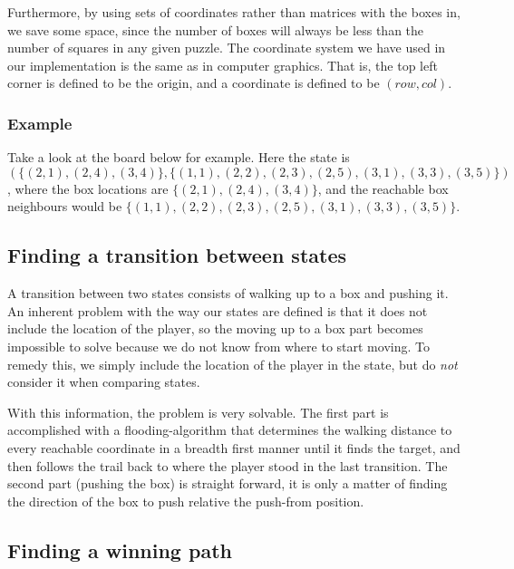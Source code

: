 \documentclass[a4paper,11pt]{article}
\begin{document}
Furthermore, by using sets of coordinates rather than matrices with the boxes in,
we save some space, since the number of boxes will always be less than the number of squares in any
given puzzle.
The coordinate system we have used in our implementation is the same as in computer graphics.
That is, the top left corner is defined to be the origin, and a coordinate is defined to be
$(row, col)$.

\subsubsection{Example}
Take a look at the board below for example.
Here the state is
$( \{(2, 1), (2, 4), (3, 4)\}, \{(1,1), (2,2), (2,3), (2,5), (3,1), (3,3), (3,5)\})$,
where the box locations are
$\{(2, 1), (2, 4), (3, 4)\}$,
and the reachable box neighbours would be
$\{(1,1), (2,2), (2,3), (2,5), (3,1), (3,3), (3,5)\} $.


\subsection{Finding a transition between states}

A transition between two states consists of walking up to a box and pushing it.
An inherent problem with the way our states are defined is that it does not include the location
of the player, so the moving up to a box part becomes impossible to solve because
we do not know from where to start moving.
To remedy this, we simply include the location of the player in the state,
but do \emph{not} consider it when comparing states.

With this information, the problem is very solvable.
The first part is accomplished with a flooding-algorithm that
determines the walking distance to every reachable coordinate in a breadth
first manner until it finds the target, and then follows the trail back to
where the player stood in the last transition.
The second part (pushing the box) is straight forward, it is only a matter 
of finding the direction of the box to push relative the push-from position.

\subsection{Finding a winning path}
\end{document}

